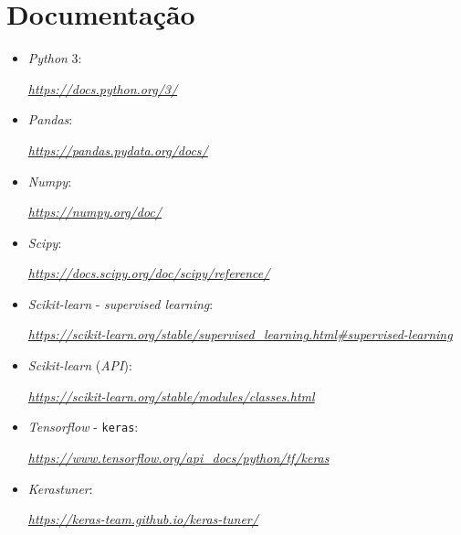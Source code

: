 \documentclass[a4paper]{report}
\begin{document}
\appendix
\chapter{Documentação} \label{ch:Documentation}
\begin{itemize}
    \item \textit{Python} 3:
	\par \textit{\url{https://docs.python.org/3/}}
	\item \textit{Pandas}:
	\par \textit{\url{https://pandas.pydata.org/docs/}}
	\item \textit{Numpy}:
	\par \textit{\url{https://numpy.org/doc/}}
	\item \textit{Scipy}:
	\par \textit{\url{https://docs.scipy.org/doc/scipy/reference/}}
	\item \textit{Scikit-learn} - \textit{supervised learning}:
	\sloppy
	\par \textit{\url{https://scikit-learn.org/stable/supervised_learning.html\#supervised-learning}}
	\item \textit{Scikit-learn} (\textsl{API}):
    \par \textit{\url{https://scikit-learn.org/stable/modules/classes.html}}
	\item \textit{Tensorflow} - \texttt{keras}:
	\par \textit{\url{https://www.tensorflow.org/api_docs/python/tf/keras}}
	\item \textit{Kerastuner}:
	\par \textit{\url{https://keras-team.github.io/keras-tuner/}}
\end{itemize}
\end{document}
